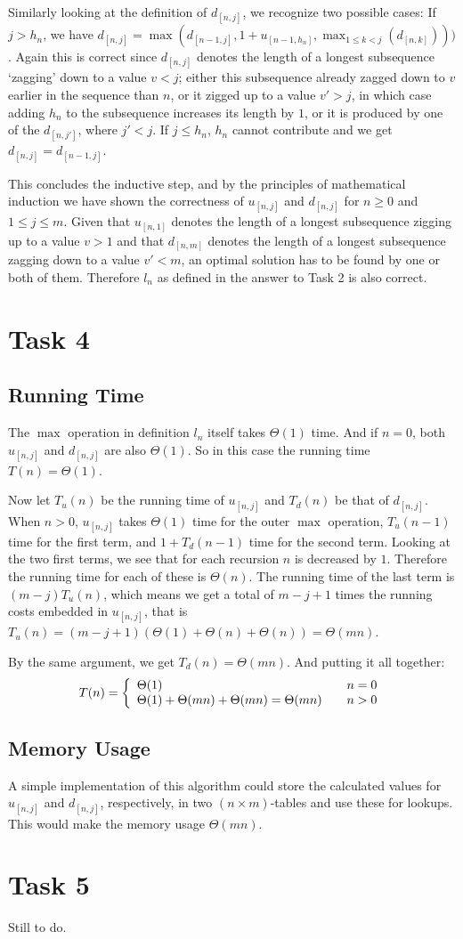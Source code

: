 \documentclass[paper=a4, fleqn]{article}
\begin{document}
Similarly looking at the definition of $d_{[n, j]}$, we recognize two possible
cases: If $j>h_n$, we have $d_{[n, j]}=\max(d_{[n-1,j]}, 1+u_{[n-1,h_n]},
\max_{1\leq k<j}(d_{[n,k]})))$. Again this is correct since $d_{[n, j]}$ denotes
the length of a longest subsequence `zagging' down to a value $v<j$; either this
subsequence already zagged down to $v$ earlier in the sequence than $n$, or it
zigged up to a value $v'>j$, in which case adding $h_n$ to the subsequence
increases its length by $1$, or it is produced by one of the $d_{[n, j']}$,
where $j'<j$. If $j\leq h_n$, $h_n$ cannot contribute and we get $d_{[n,
  j]}=d_{[n-1, j]}$.

This concludes the inductive step, and by the principles of mathematical
induction we have shown the correctness of $u_{[n, j]}$ and $d_{[n, j]}$ for
$n\geq 0$ and $1\leq j\leq m$. Given that $u_{[n, 1]}$ denotes the length of a
longest subsequence zigging up to a value $v>1$ and that $d_{[n, m]}$ denotes
the length of a longest subsequence zagging down to a value $v'<m$, an optimal
solution has to be found by one or both of them. Therefore $l_n$ as defined in
the answer to Task 2 is also correct.

\section*{Task 4}

\subsection*{Running Time}

The $\max$ operation in definition $l_n$ itself takes $\Theta(1)$ time. And if
$n=0$, both $u_{[n,j]}$ and $d_{[n,j]}$ are also $\Theta(1)$. So in this case
the running time $T(n)=\Theta(1)$.

Now let $T_u(n)$ be the running time of $u_{[n,j]}$ and $T_d(n)$ be that of
$d_{[n,j]}$. When $n>0$, $u_{[n,j]}$ takes $\Theta(1)$ time for the outer $\max$
operation, $T_u(n-1)$ time for the first term, and $1+T_d(n-1)$ time for the
second term. Looking at the two first terms, we see that for each recursion $n$
is decreased by $1$. Therefore the running time for each of these is
$\Theta(n)$. The running time of the last term is $(m-j)T_u(n)$, which means we
get a total of $m-j+1$ times the running costs embedded in $u_{[n,j]}$, that is
$T_u(n)=(m-j+1)(\Theta(1) + \Theta(n) + \Theta(n)) = \Theta(mn)$.

By the same argument, we get $T_d(n)=\Theta(mn)$. And putting it all together:
\[
T(n) = \left\{
  \begin{array}{l l}
    \Theta(1)& \quad \text{$n=0$}\\
    \Theta(1)
+ \Theta(mn) + \Theta(mn) = \Theta(mn) &\quad\text{$n>0$}
\end{array}\right.
\]

\subsection*{Memory Usage}

A simple implementation of this algorithm could store the calculated values for
$u_{[n,j]}$ and $d_{[n,j]}$, respectively, in two $(n\times m)$-tables and use
these for lookups. This would make the memory usage $\Theta(mn)$.

\section*{Task 5}

Still to do.
\end{document}
